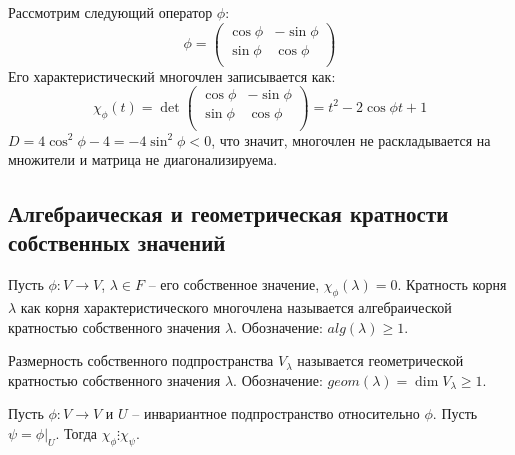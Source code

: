 \begin{example}
    Рассмотрим следующий оператор $\phi$:
    \begin{equation*}
    \phi =
        \left(
            \begin{array}{cc}
            \cos{\phi} & - \sin{\phi} \\
            \sin{\phi} & \cos{\phi} \\
            \end{array}
        \right)
    \end{equation*}
    Его характеристический многочлен записывается как:
    \begin{equation*}
    \chi_{\phi}(t) = \det
        \left(
            \begin{array}{cc}
            \cos{\phi} & - \sin{\phi} \\
            \sin{\phi} & \cos{\phi} \\
            \end{array}
        \right) = t^2 - 2\cos{\phi} t + 1
    \end{equation*}
    $D = 4 \cos^2{\phi} - 4 = - 4\sin^2{\phi} < 0$, что значит, многочлен не раскладывается на множители 
    и матрица не диагонализируема.
\end{example}

\subsection{Алгебраическая и геометрическая кратности собственных значений}

\begin{definition}
    Пусть $\phi: V \to V$, $\lambda \in F$ -- его собственное значение, $\chi_{\phi}(\lambda) = 0$.
    Кратность корня $\lambda$ как корня характеристического многочлена называется алгебраической 
    кратностью собственного значения $\lambda$. Обозначение: $alg(\lambda) \geq 1$.
\end{definition}

\begin{definition}
    Размерность собственного подпространства $V_{\lambda}$ называется геометрической кратностью 
    собственного значения $\lambda$. Обозначение: $geom(\lambda) = \dim V_{\lambda} \geq 1$.
\end{definition}

\begin{proposition}
    \label{pr4.1}
    Пусть $\phi: V \to V$ и $U$ -- инвариантное подпространство относительно $\phi$. 
    Пусть $\psi = \phi \vert_{U}$. Тогда $\chi_{\phi} \vdots \chi_{\psi}$.
\end{proposition}

